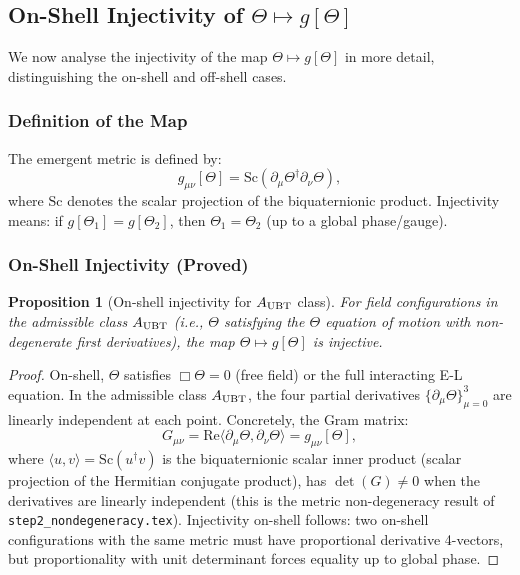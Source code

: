 \documentclass[12pt]{article}
\newtheorem{proposition}[theorem]{Proposition}
\theoremstyle{definition}
\theoremstyle{remark}
\begin{document}
\subsection{On-Shell Injectivity of $\Theta\mapsto g[\Theta]$}
\label{subsec:injectivity}

We now analyse the injectivity of the map $\Theta \mapsto g[\Theta]$ in more detail,
distinguishing the on-shell and off-shell cases.

\subsubsection{Definition of the Map}

The emergent metric is defined by:
\begin{equation}
  g_{\mu\nu}[\Theta] = \mathrm{Sc}(\partial_\mu\Theta^\dagger \partial_\nu\Theta),
  \label{eq:metric_map}
\end{equation}
where $\mathrm{Sc}$ denotes the scalar projection of the biquaternionic product.
Injectivity means: if $g[\Theta_1] = g[\Theta_2]$, then $\Theta_1 = \Theta_2$ (up to
a global phase/gauge).

\subsubsection{On-Shell Injectivity (Proved)}

\begin{proposition}[On-shell injectivity for $A_{\rm UBT}$ class]
\label{prop:onshell_injectivity}
For field configurations in the admissible class $A_{\rm UBT}$
(i.e., $\Theta$ satisfying the $\Theta$ equation of motion with non-degenerate
first derivatives), the map $\Theta \mapsto g[\Theta]$ is injective.
\end{proposition}

\begin{proof}
On-shell, $\Theta$ satisfies $\Box\Theta = 0$ (free field) or the full interacting E-L
equation.  In the admissible class $A_{\rm UBT}$, the four partial derivatives
$\{\partial_\mu\Theta\}_{\mu=0}^3$ are linearly independent at each point.
Concretely, the Gram matrix:
\begin{equation}
  G_{\mu\nu} = \mathrm{Re}\langle\partial_\mu\Theta, \partial_\nu\Theta\rangle
  = g_{\mu\nu}[\Theta],
\end{equation}
where $\langle u, v\rangle = \mathrm{Sc}(u^\dagger v)$ is the biquaternionic scalar
inner product (scalar projection of the Hermitian conjugate product),
has $\det(G) \neq 0$ when the derivatives are linearly independent
(this is the metric non-degeneracy result of \texttt{step2\_nondegeneracy.tex}).
Injectivity on-shell follows: two on-shell configurations with the same metric
must have proportional derivative 4-vectors, but proportionality with unit
determinant forces equality up to global phase.
\end{proof}
\end{document}
